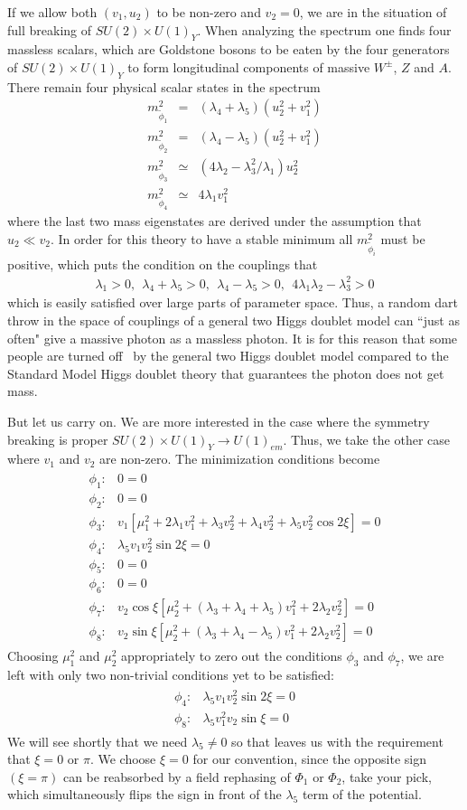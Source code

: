 \documentclass[12pt]{article}
\def\beq{\begin{eqnarray}}
\def\eeq{\end{eqnarray}}
\def\bea{\begin{eqnarray}}
\def\eea{\end{eqnarray}}
\begin{document}
If we allow both $(v_1,u_2)$ to be non-zero and $v_2=0$, we are in the situation of full breaking of $SU(2)\times U(1)_Y$.  When analyzing the spectrum one finds four massless scalars, which are Goldstone bosons to be eaten by the four generators of $SU(2)\times U(1)_Y$ to form longitudinal components of massive $W^\pm$, $Z$ and $A$.  There remain four physical scalar states in the spectrum
\bea
m^2_{\tilde \phi_1} & = & (\lambda_4+\lambda_5)(u^2_2+v^2_1) \\
m^2_{\tilde\phi_2}& = & (\lambda_4-\lambda_5)(u_2^2+v^2_1) \\
m^2_{\tilde\phi_3}& \simeq & (4\lambda_2-\lambda_3^2/\lambda_1)u^2_2\\
m^2_{\tilde\phi_4}&\simeq & 4\lambda_1v^2_1
\eeq
where the last two mass eigenstates are derived under the assumption that $u_2\ll v_2$. In order for this theory to have a stable minimum all $m^2_{\tilde\phi_i}$ must be positive, which puts the condition on the couplings that
\bea
\lambda_1>0,~~\lambda_4+\lambda_5 >0,~~\lambda_4-\lambda_5>0,~~4\lambda_1\lambda_2-\lambda^2_3>0
\eea
which is easily satisfied over large parts of parameter space. Thus, a random dart throw in the space of couplings of a general two Higgs doublet model can ``just as often" give a massive photon as a massless photon. It is for this reason that some people are turned off~\cite{Veltman:1997nm} by the general two Higgs doublet model compared to the Standard Model Higgs doublet theory that guarantees the photon does not get mass.

But let us carry on. We are more interested in the case where the symmetry breaking is proper  $SU(2)\times U(1)_Y\to U(1)_{em}$.  Thus, we take the other case where $v_1$ and $v_2$ are non-zero. The minimization conditions  become
\beq
\begin{array}{cl}
\phi_1: & 0=0 \\
\phi_2: & 0 =0 \\
\phi_3: & v_1[\mu^2_1+2\lambda_1v^2_1+\lambda_3 v^2_2+\lambda_4v^2_2+\lambda_5v^2_2\cos 2\xi ]=0 \\
\phi_4: & \lambda_5v_1v_2^2\sin 2\xi =0 \\
\phi_5: & 0=0\\
\phi_6: & 0=0 \\
\phi_7: & v_2\cos\xi [\mu^2_2+(\lambda_3+\lambda_4+\lambda_5)v^2_1+2\lambda_2v^2_2]=0 \\
\phi_8: & v_2\sin\xi[\mu^2_2+(\lambda_3+\lambda_4-\lambda_5)v^2_1+2\lambda_2 v^2_2]=0 
\end{array}
\eeq
Choosing $\mu^2_1$ and $\mu^2_2$  appropriately to zero out the conditions $\phi_3$ and $\phi_7$, we are left with only two non-trivial conditions yet to be satisfied:
\beq
\begin{array}{cl}
\phi_4: & \lambda_5v_1v^2_2\sin 2\xi=0 \\
\phi_8: & \lambda_5 v^2_1v_2\sin\xi=0 
\end{array}
\eeq
We will see shortly that we need $\lambda_5\neq 0$ so that leaves us with the requirement that $\xi=0$ or $\pi$.  We  choose $\xi=0$ for our convention, since the opposite sign $(\xi=\pi)$  can be reabsorbed by a field rephasing of $\Phi_1$ or $\Phi_2$, take your pick, which simultaneously flips the sign in front of the $\lambda_5$ term of the potential. 
\end{document}

